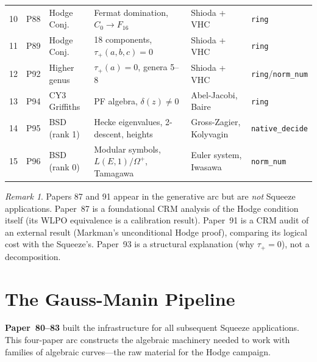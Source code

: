 \documentclass[11pt,twoside,openany]{report}
\theoremstyle{remark}
\newtheorem*{remark}{Remark}
\newcommand{\WLPO}{\textsf{WLPO}}
\newcommand{\paperref}[1]{\textbf{Paper~#1}}
\begin{document}
\begin{table}[htbp]
{\begin{tabular}{@{}c l l p{3.2cm} p{3cm} l@{}}
10 & P88 & Hodge Conj. & Fermat domination, $C_0 \to F_{16}$ & Shioda + VHC & \texttt{ring} \\
\rowcolor{green!4}
11 & P89 & Hodge Conj. & 18 components, $\tau_+(a,b,c) = 0$ & Shioda + VHC & \texttt{ring} \\
12 & P92 & Higher genus & $\tau_+(a) = 0$, genera 5--8 & Shioda + VHC & \texttt{ring}/\texttt{norm\_num} \\
\rowcolor{green!4}
13 & P94 & CY3 Griffiths & PF algebra, $\delta(z) \neq 0$ & Abel-Jacobi, Baire & \texttt{ring} \\
14 & P95 & BSD (rank 1) & Hecke eigenvalues, 2-descent, heights & Gross-Zagier, Kolyvagin & \texttt{native\_decide} \\
\rowcolor{green!4}
15 & P96 & BSD (rank 0) & Modular symbols, $L(E,1)/\Omega^+$, Tamagawa & Euler system, Iwasawa & \texttt{norm\_num} \\
\bottomrule
\end{tabular}%
}%
\end{table}

\begin{remark}
Papers 87 and 91 appear in the generative arc but are \emph{not} Squeeze applications. Paper~87 is a foundational CRM analysis of the Hodge condition itself (its \WLPO{} equivalence is a calibration result). Paper~91 is a CRM audit of an external result (Markman's unconditional Hodge proof), comparing its logical cost with the Squeeze's. Paper~93 is a structural explanation (why $\tau_+ = 0$), not a decomposition.
\end{remark}


\section{The Gauss-Manin Pipeline}

\paperref{80--83} built the infrastructure for all subsequent Squeeze applications. This four-paper arc constructs the algebraic machinery needed to work with families of algebraic curves---the raw material for the Hodge campaign.
\end{document}
